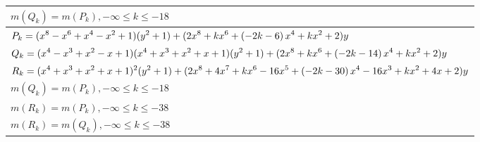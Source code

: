 \documentclass{amsart}
\begin{document}
\begin{longtable}{|l|}
\(\displaystyle m(Q_k) = m(P_{k}),-\infty \leqslant k \leqslant -18\)\\
\hline
\(\displaystyle P_k=(x^8
 - x^6
 + x^4
 - x^2
 + 1)(y^2+1)+(2\*x^8
 + k\*x^6
 + \left(-2\*k
 - 6\right) \*x^4
 + k\*x^2
 + 2)y\)\\
\(\displaystyle Q_k=(x^4
 - x^3
 + x^2
 - x
 + 1)(x^4
 + x^3
 + x^2
 + x
 + 1)(y^2+1)+(2\*x^8
 + k\*x^6
 + \left(-2\*k
 - 14\right) \*x^4
 + k\*x^2
 + 2)y\)\\
\(\displaystyle R_k=(x^4
 + x^3
 + x^2
 + x
 + 1)^{2}(y^2+1)+(2\*x^8
 + 4\*x^7
 + k\*x^6
 - 16\*x^5
 + \left(-2\*k
 - 30\right) \*x^4
 - 16\*x^3
 + k\*x^2
 + 4\*x
 + 2)y\)\\
\(\displaystyle m(Q_k) = m(P_{k}),-\infty \leqslant k \leqslant -18\)\\
\(\displaystyle m(R_k) = m(P_{k}),-\infty \leqslant k \leqslant -38\)\\
\(\displaystyle m(R_k) = m(Q_{k}),-\infty \leqslant k \leqslant -38\)\\
\hline
\end{longtable}
\end{document}
